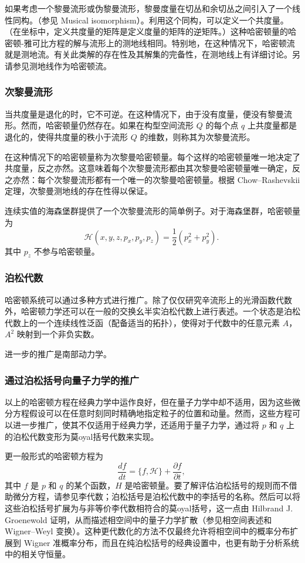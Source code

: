 如果考虑一个黎曼流形或伪黎曼流形，黎曼度量在切丛和余切丛之间引入了一个线性同构。（参见 Musical isomorphism）。利用这个同构，可以定义一个共度量。（在坐标中，定义共度量的矩阵是定义度量的矩阵的逆矩阵。）这种哈密顿量的哈密顿-雅可比方程的解与流形上的测地线相同。特别地，在这种情况下，哈密顿流就是测地流。有关此类解的存在性及其解集的完备性，在测地线上有详细讨论。另请参见测地线作为哈密顿流。 
\subsubsection{次黎曼流形}
当共度量是退化的时，它不可逆。在这种情况下，由于没有度量，便没有黎曼流形。然而，哈密顿量仍然存在。如果在构型空间流形 \( Q \) 的每个点 \( q \) 上共度量都是退化的，使得共度量的秩小于流形 \( Q \) 的维数，则称其为次黎曼流形。

在这种情况下的哈密顿量称为次黎曼哈密顿量。每个这样的哈密顿量唯一地决定了共度量，反之亦然。这意味着每个次黎曼流形都由其次黎曼哈密顿量唯一确定，反之亦然：每个次黎曼流形都有一个唯一的次黎曼哈密顿量。根据 Chow–Rashevskii 定理，次黎曼测地线的存在性得以保证。

连续实值的海森堡群提供了一个次黎曼流形的简单例子。对于海森堡群，哈密顿量为
\[
\mathcal{H}(x, y, z, p_x, p_y, p_z) = \frac{1}{2} (p_x^2 + p_y^2).~
\]
其中 \( p_z \) 不参与哈密顿量。
\subsubsection{泊松代数}
哈密顿系统可以通过多种方式进行推广。除了仅仅研究辛流形上的光滑函数代数外，哈密顿力学还可以在一般的交换幺半实泊松代数上进行表述。一个状态是泊松代数上的一个连续线性泛函（配备适当的拓扑），使得对于代数中的任意元素 \( A \)，\( A^2 \) 映射到一个非负实数。

进一步的推广是南部动力学。
\subsubsection{通过泊松括号向量子力学的推广}
以上的哈密顿方程在经典力学中运作良好，但在量子力学中却不适用，因为这些微分方程假设可以在任意时刻同时精确地指定粒子的位置和动量。然而，这些方程可以进一步推广，使其不仅适用于经典力学，还适用于量子力学，通过将 \( p \) 和 \( q \) 上的泊松代数变形为莫oyal括号代数来实现。

更一般形式的哈密顿方程为
\[
\frac{d f}{d t} = \{f, \mathcal{H}\} + \frac{\partial f}{\partial t},~
\]
其中 \( f \) 是 \( p \) 和 \( q \) 的某个函数，\( H \) 是哈密顿量。要了解评估泊松括号的规则而不借助微分方程，请参见李代数；泊松括号是泊松代数中的李括号的名称。然后可以将这些泊松括号扩展为与非等价李代数相符合的莫oyal括号，这一点由 Hilbrand J. Groenewold 证明，从而描述相空间中的量子力学扩散（参见相空间表述和 Wigner–Weyl 变换）。这种更代数化的方法不仅最终允许将相空间中的概率分布扩展到 Wigner 准概率分布，而且在纯泊松括号的经典设置中，也更有助于分析系统中的相关守恒量。
